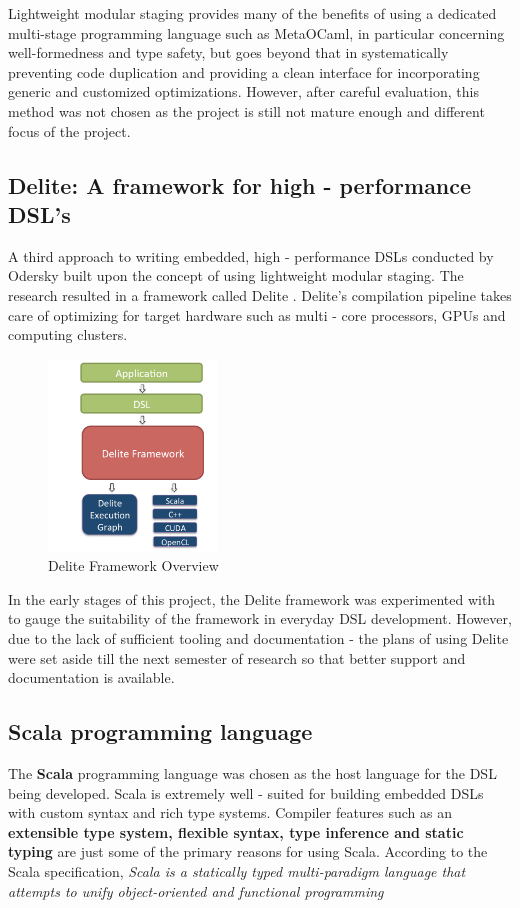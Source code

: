 \documentclass[12pt]{article}
\begin{document}
\noindent
Lightweight modular staging provides many of the benefits of using a dedicated multi-stage programming language such as MetaOCaml, in particular concerning well-formedness and type safety, but goes beyond that in systematically preventing code duplication and providing a clean interface for incorporating generic and customized optimizations. However, after careful evaluation, this method was not chosen as the project is still not mature enough and different focus of the project.

\subsection{Delite: A framework for high - performance DSL's}
A third approach to writing embedded, high - performance DSLs conducted by Odersky built upon the concept of using lightweight modular staging. The research resulted in a framework called Delite \cite{delite}. Delite's compilation pipeline takes care of optimizing for target hardware such as multi - core processors, GPUs and computing clusters.

\begin{figure}[H]
  \centering
    \includegraphics[width=170px]{figures/delite.png}
  \caption{Delite Framework Overview}
\end{figure}

\noindent
In the early stages of this project, the Delite framework was experimented with to gauge the suitability of the framework in everyday DSL development. However, due to the lack of sufficient tooling and documentation - the plans of using Delite were set aside till the next semester of research so that better support and documentation is available.
\bigskip

\subsection{Scala programming language}
The \textbf{Scala} programming language was chosen as the host language for the DSL being developed. Scala is extremely well - suited for building embedded DSLs with custom syntax and rich type systems. Compiler features such as an \textbf{extensible type system, flexible syntax, type inference and static typing} are just some of the primary reasons for using Scala. According to the Scala specification, \textit{Scala is a statically typed multi-paradigm language that attempts to unify object-oriented and functional programming} \cite{scala}
\bigskip
\end{document}
